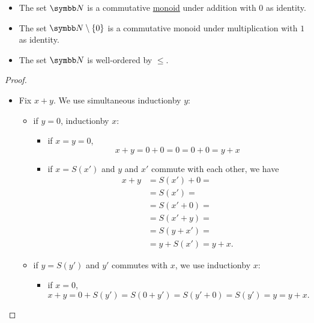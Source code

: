 \begin{proposition}\label{def:natural_numbers}
  \begin{itemize}\mbox{}
    \item The set \( \BN \) is a commutative \hyperref[def:magma]{monoid} under addition with \( 0 \) as identity.
    \item The set \( \BN \setminus \{ 0 \} \) is a commutative monoid under multiplication with \( 1 \) as identity.
    \item The set \( \BN \) is well-ordered by \( \leq \).
  \end{itemize}
\end{proposition}
\begin{proof}
  \begin{itemize}\mbox{}
    \item Fix \( x + y \). We use simultaneous induction\IND by \( y \):
    \begin{itemize}
      \item if \( y = 0 \), induction\IND by \( x \):
      \begin{itemize}
        \item if \( x = y = 0 \),
        \begin{equation*}
          x + y = 0 + 0 = 0 = 0 + 0 = y + x
        \end{equation*}

        \item if \( x = S(x') \) and \( y \) and \( x' \) commute with each other, we have
        \begin{align*}
          x + y
          &=
          S(x') + 0
          = \\ &=
          S(x')
          = \\ &=
          S(x' + 0)
          = \\ &=
          S(x' + y)
          = \\ &=
          S(y + x')
          = \\ &=
          y + S(x')
          =
          y + x.
        \end{align*}
      \end{itemize}

      \item if \( y = S(y') \) and \( y' \) commutes with \( x \), we use induction\IND by \( x \):
      \begin{itemize}
        \item if \( x = 0 \),
        \begin{equation*}
          x + y = 0 + S(y') = S(0 + y') = S(y' + 0) = S(y') = y = y + x.
        \end{equation*}


\end{itemize}
\end{itemize}
\end{itemize}
\end{proof}
